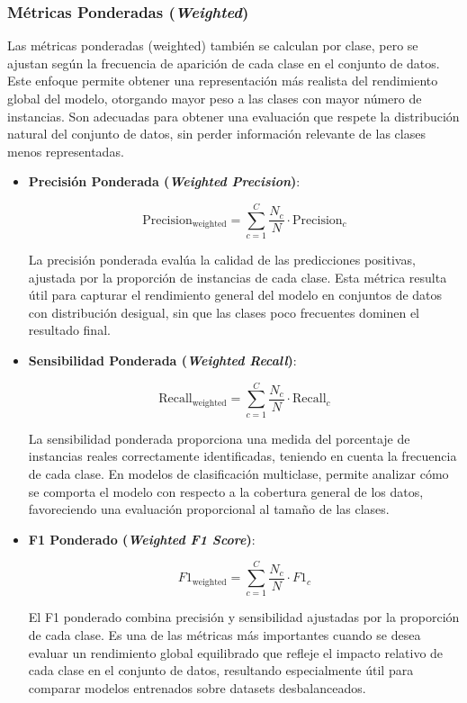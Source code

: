 \subsubsection*{Métricas Ponderadas (\textit{Weighted})}

Las métricas ponderadas (weighted) también se calculan por clase, pero se ajustan según la frecuencia de aparición de cada clase en el conjunto de datos. Este enfoque permite obtener una representación más realista del rendimiento global del modelo, otorgando mayor peso a las clases con mayor número de instancias. Son adecuadas para obtener una evaluación que respete la distribución natural del conjunto de datos, sin perder información relevante de las clases menos representadas.

\begin{itemize}

\item \textbf{Precisión Ponderada (\textit{Weighted Precision})}:

\begin{equation}
\text{Precision}_{\text{weighted}} = \sum_{c=1}^{C} \frac{N_c}{N} \cdot \text{Precision}_c
\end{equation}

La precisión ponderada evalúa la calidad de las predicciones positivas, ajustada por la proporción de instancias de cada clase. Esta métrica resulta útil para capturar el rendimiento general del modelo en conjuntos de datos con distribución desigual, sin que las clases poco frecuentes dominen el resultado final.

\item \textbf{Sensibilidad Ponderada (\textit{Weighted Recall})}:

\begin{equation}
\text{Recall}_{\text{weighted}} = \sum_{c=1}^{C} \frac{N_c}{N} \cdot \text{Recall}_c
\end{equation}

La sensibilidad ponderada proporciona una medida del porcentaje de instancias reales correctamente identificadas, teniendo en cuenta la frecuencia de cada clase. En modelos de clasificación multiclase, permite analizar cómo se comporta el modelo con respecto a la cobertura general de los datos, favoreciendo una evaluación proporcional al tamaño de las clases.

\item \textbf{F1 Ponderado (\textit{Weighted F1 Score})}:

\begin{equation}
F1_{\text{weighted}} = \sum_{c=1}^{C} \frac{N_c}{N} \cdot F1_c
\end{equation}

El F1 ponderado combina precisión y sensibilidad ajustadas por la proporción de cada clase. Es una de las métricas más importantes cuando se desea evaluar un rendimiento global equilibrado que refleje el impacto relativo de cada clase en el conjunto de datos, resultando especialmente útil para comparar modelos entrenados sobre datasets desbalanceados.

\end{itemize}

